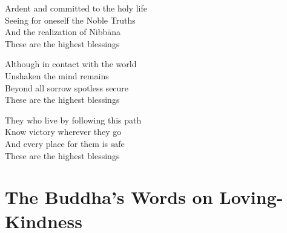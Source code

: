 \bigskip

Ardent and committed
to the holy life\\
Seeing for oneself the Noble Truths\\
And the realization of Nibbāna\\
These are the highest blessings

\bigskip

Although in contact with the world\\
Unshaken the mind remains\\
Beyond all sorrow spotless secure\\
These are the highest blessings

\bigskip

They who live by following this path\\
Know victory wherever they go\\
And every place for them is safe\\
These are the highest blessings

\suttaRef{[Snp 2.4]}


\section{The Buddha's Words on Loving-Kindness}
\label{words-on-loving-kindness}

\begin{leader}
\end{leader}

